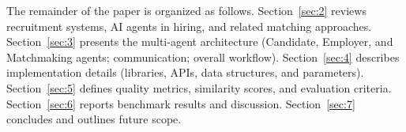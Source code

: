 The remainder of the paper is organized as follows.
Section~\ref{sec:2} reviews recruitment systems, AI agents in hiring, and related matching approaches.
Section~\ref{sec:3} presents the multi-agent architecture (Candidate, Employer, and Matchmaking agents; communication; overall workflow).
Section~\ref{sec:4} describes implementation details (libraries, APIs, data structures, and parameters).
Section~\ref{sec:5} defines quality metrics, similarity scores, and evaluation criteria.
Section~\ref{sec:6} reports benchmark results and discussion.
Section~\ref{sec:7} concludes and outlines future scope.
